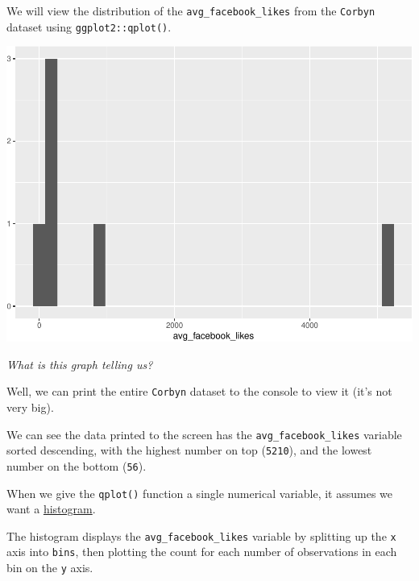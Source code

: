 \documentclass[letterpaper,12pt,twoside,]{pinp}
\begin{document}
We will view the distribution of the \texttt{avg\_facebook\_likes} from
the \texttt{Corbyn} dataset using \texttt{ggplot2::qplot()}.

\begin{Shaded}
\begin{Highlighting}[]
\SpecialCharTok{\%\textgreater{}\%} 
\SpecialCharTok{::}\NormalTok{(}
\end{Highlighting}
\end{Shaded}

\begin{center}\includegraphics{03-intro-to-ggplot2_files/figure-latex/Corbyn-avg_facebook_likes-1} \end{center}

\emph{What is this graph telling us?}

Well, we can print the entire \texttt{Corbyn} dataset to the console to
view it (it's not very big).

We can see the data printed to the screen has the
\texttt{avg\_facebook\_likes} variable sorted descending, with the
highest number on top (\texttt{5210}), and the lowest number on the
bottom (\texttt{56}).

When we give the \texttt{qplot()} function a single numerical variable,
it assumes we want a
\href{https://ggplot2.tidyverse.org/reference/geom_histogram.html}{histogram}.

The histogram displays the \texttt{avg\_facebook\_likes} variable by
splitting up the \texttt{x} axis into \texttt{bins}, then plotting the
count for each number of observations in each bin on the \texttt{y}
axis.
\end{document}
